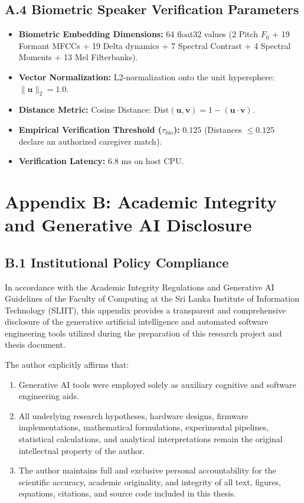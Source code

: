 \documentclass[12pt, a4paper]{report}
\begin{document}
\subsection*{A.4 Biometric Speaker Verification Parameters}
\begin{itemize}
    \item \textbf{Biometric Embedding Dimensions:} 64 float32 values (2 Pitch $F_0$ + 19 Formant MFCCs + 19 Delta dynamics + 7 Spectral Contrast + 4 Spectral Moments + 13 Mel Filterbanks).
    \item \textbf{Vector Normalization:} L2-normalization onto the unit hypersphere: $\|\mathbf{u}\|_2 = 1.0$.
    \item \textbf{Distance Metric:} Cosine Distance: $\text{Dist}(\mathbf{u}, \mathbf{v}) = 1 - (\mathbf{u} \cdot \mathbf{v})$.
    \item \textbf{Empirical Verification Threshold ($\tau_{\text{bio}}$):} $0.125$ (Distances $\le 0.125$ declare an authorized caregiver match).
    \item \textbf{Verification Latency:} $6.8\text{ ms}$ on host CPU.
\end{itemize}

\clearpage

\section*{Appendix B: Academic Integrity and Generative AI Disclosure}

\subsection*{B.1 Institutional Policy Compliance}
In accordance with the Academic Integrity Regulations and Generative AI Guidelines of the Faculty of Computing at the Sri Lanka Institute of Information Technology (SLIIT), this appendix provides a transparent and comprehensive disclosure of the generative artificial intelligence and automated software engineering tools utilized during the preparation of this research project and thesis document.

The author explicitly affirms that:
\begin{enumerate}
    \item Generative AI tools were employed solely as auxiliary cognitive and software engineering aids.
    \item All underlying research hypotheses, hardware designs, firmware implementations, mathematical formulations, experimental pipelines, statistical calculations, and analytical interpretations remain the original intellectual property of the author.
    \item The author maintains full and exclusive personal accountability for the scientific accuracy, academic originality, and integrity of all text, figures, equations, citations, and source code included in this thesis.
\end{enumerate}
\end{document}
